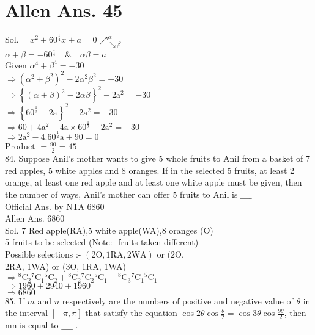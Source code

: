 \documentclass[10pt]{article}
\begin{document}
\section*{Allen Ans. 45}
Sol. \(\quad x^{2}+60^{\frac{1}{4}} x+a=0 \nearrow_{\searrow \beta}^{\alpha}\)\\
\(\alpha+\beta=-60^{\frac{1}{4}} \quad \& \quad \alpha \beta=a\)\\
Given \(\alpha^{4}+\beta^{4}=-30\)\\
\(\Rightarrow\left(\alpha^{2}+\beta^{2}\right)^{2}-2 \alpha^{2} \beta^{2}=-30\)\\
\(\Rightarrow\left\{(\alpha+\beta)^{2}-2 \alpha \beta\right\}^{2}-2 \mathrm{a}^{2}=-30\)\\
\(\Rightarrow\left\{60^{\frac{1}{2}}-2 \mathrm{a}\right\}^{2}-2 \mathrm{a}^{2}=-30\)\\
\(\Rightarrow 60+4 \mathrm{a}^{2}-4 \mathrm{a} \times 60^{\frac{1}{2}}-2 \mathrm{a}^{2}=-30\)\\
\(\Rightarrow 2 \mathrm{a}^{2}-4.60^{\frac{1}{2}} \mathrm{a}+90=0\)\\
Product \(=\frac{90}{2}=45\)\\
84. Suppose Anil's mother wants to give 5 whole fruits to Anil from a basket of 7 red apples, 5 white apples and 8 oranges. If in the selected 5 fruits, at least 2 orange, at least one red apple and at least one white apple must be given, then the number of ways, Anil's mother can offer 5 fruits to Anil is \(\_\_\_\_\)\\
Official Ans. by NTA 6860\\
Allen Ans. 6860\\
Sol. 7 Red apple(RA),5 white apple(WA),8 oranges (O)\\
5 fruits to be selected (Note:- fruits taken different)\\
Possible selections :- \((2 \mathrm{O}, 1 \mathrm{RA}, 2 \mathrm{WA})\) or \((2 \mathrm{O}\),\\
2RA, 1WA) or (3O, 1RA, 1WA)\\
\(\Rightarrow{ }^{8} \mathrm{C}_{2}{ }^{7} \mathrm{C}_{1}{ }^{5} \mathrm{C}_{2}+{ }^{8} \mathrm{C}_{2}{ }^{7} \mathrm{C}_{2}{ }^{5} \mathrm{C}_{1}+{ }^{8} \mathrm{C}_{3}{ }^{7} \mathrm{C}_{1}{ }^{5} \mathrm{C}_{1}\)\\
\(\Rightarrow 1960+2940+1960\)\\
\(\Rightarrow 6860\)\\
85. If \(m\) and \(n\) respectively are the numbers of positive and negative value of \(\theta\) in the interval \([-\pi, \pi]\) that satisfy the equation \(\cos 2 \theta \cos \frac{\theta}{2}=\cos 3 \theta \cos \frac{9 \theta}{2}\), then mn is equal to \(\_\_\_\_\) .
\end{document}
